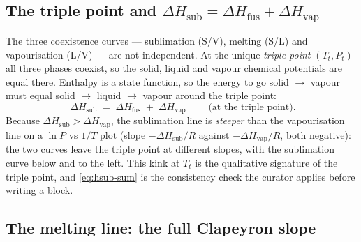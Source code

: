 \documentclass[11pt,a4paper]{article}
\newcommand{\Hvap}{\Delta H_{\!\mathrm{vap}}}
\newcommand{\Hsub}{\Delta H_{\!\mathrm{sub}}}
\newcommand{\Hfus}{\Delta H_{\!\mathrm{fus}}}
\begin{document}
\subsection{The triple point and \texorpdfstring{$\Hsub=\Hfus+\Hvap$}{Hsub=Hfus+Hvap}}

The three coexistence curves --- sublimation (S/V), melting (S/L) and
vapourisation (L/V) --- are not independent.  At the unique
\emph{triple point} $(T_t, P_t)$ all three phases coexist, so the
solid, liquid and vapour chemical potentials are equal there.
Enthalpy is a state function, so the energy to go solid $\to$ vapour
must equal solid $\to$ liquid $\to$ vapour around the triple point:
\begin{equation}
   \boxed{\;\Hsub \;=\; \Hfus \;+\; \Hvap\;}
   \qquad\text{(at the triple point).}
   \label{eq:hsub-sum}
\end{equation}
Because $\Hsub>\Hvap$, the sublimation line is \emph{steeper} than the
vapourisation line on a $\ln P$ vs $1/T$ plot (slope $-\Hsub/R$
against $-\Hvap/R$, both negative): the two curves leave the triple
point at different slopes, with the sublimation curve below and to the
left.  This kink at $T_t$ is the qualitative signature of the triple
point, and \eqref{eq:hsub-sum} is the consistency check the curator
applies before writing a  block.

\subsection{The melting line: the full Clapeyron slope}
\end{document}
